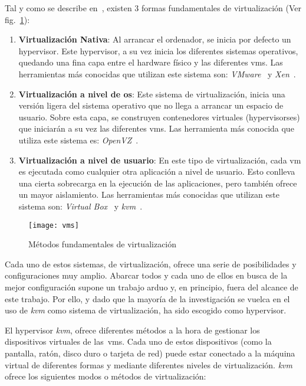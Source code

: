 Tal y como se describe en~\cite{schlosser2011performance}, existen 3 formas fundamentales de virtualización (Ver fig.~\ref{fig:ea:vm}):

\begin{enumerate}
\item \textbf{Virtualización Nativa}: Al arrancar el ordenador, se inicia por defecto un \gls{hypervisor}. Este \gls{hypervisor}, a su vez inicia los diferentes sistemas operativos, quedando una fina capa entre el hardware físico y las diferentes \glspl{vm}. Las herramientas más conocidas que utilizan este sistema son: \textit{VMware}~\cite{bib:vmware} y \textit{Xen}~\cite{bib:xen}.
\item \textbf{Virtualización a nivel de \gls{os}}: Este sistema de virtualización, inicia una versión ligera del sistema operativo que no llega a arrancar un espacio de usuario. Sobre esta capa, se construyen contenedores virtuales (\glspl{hypervisor}es) que iniciarán a su vez las diferentes \glspl{vm}. Las herramienta más conocida que utiliza este sistema es: \textit{OpenVZ}~\cite{bib:openvz}.
\item \textbf{Virtualización a nivel de usuario}: En este tipo de virtualización, cada \gls{vm} es ejecutada como cualquier otra aplicación a nivel de usuario. Esto conlleva una cierta sobrecarga en la ejecución de las aplicaciones, pero también ofrece un mayor aislamiento. Las herramientas más conocidas que utilizan este sistema son: \textit{Virtual Box}~\cite{bib:virtualbox} y \textit{\gls{kvm}}~\cite{bib:kvm}.
\end{enumerate}

\begin{figure}[!bth]
\centering
\texttt{[image: vms]}
\caption{Métodos fundamentales de virtualización}
\label{fig:ea:vm}
\end{figure}

Cada uno de estos sistemas, de virtualización, ofrece una serie de posibilidades y configuraciones muy amplio. Abarcar todos y cada uno de ellos en busca de la mejor configuración supone un trabajo arduo y, en principio, fuera del alcance de este trabajo. Por ello, y dado que la mayoría de la investigación se vuelca en el uso de \textit{\gls{kvm}} como sistema de virtualización, ha sido escogido como \gls{hypervisor}.

El \gls{hypervisor} \textit{\gls{kvm}}, ofrece diferentes métodos a la hora de gestionar los dispositivos virtuales de las~\glspl{vm}. Cada uno de estos dispositivos (como la pantalla, ratón, disco duro o tarjeta de red) puede estar conectado a la máquina virtual de diferentes formas y mediante diferentes niveles de virtualización. \textit{\gls{kvm}} ofrece los siguientes modos o métodos de virtualización:

